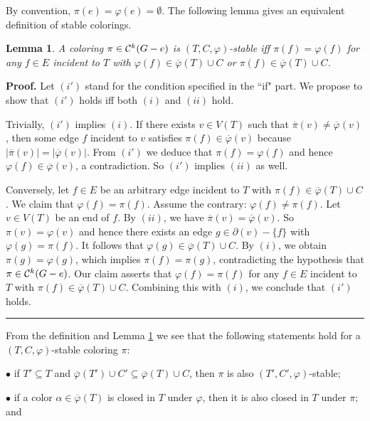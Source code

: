 \documentclass[11pt]{article}
\newtheorem{lemma}[theorem]{Lemma}
\def\qed{\hfill \rule{4pt}{7pt}}
\begin{document}
\vspace{-2mm}
By convention, $\pi(e)=\varphi(e)=\emptyset$. The following lemma gives an equivalent definition of stable colorings.

\begin{lemma} \label{sc1}
A coloring $\pi \in {\cal C}^k(G-e)$ is $(T, C, \varphi)$-stable iff $\pi(f)=\varphi(f)$ for any $f\in E$ incident to $T$ with 
$\varphi(f)\in \overline{\varphi}(T)\cup C$ or $\pi(f)\in \overline{\varphi}(T)\cup C$.
\end{lemma}

{\bf Proof.}  Let $(i')$ stand for the condition specified in the ``if" part. We propose to show that $(i')$ holds iff
both $(i)$ and $(ii)$ hold. 

Trivially, $(i')$ implies $(i)$. If there exists $v\in V(T)$ such that $\overline{\pi} (v) \ne \overline{\varphi}(v)$, 
then some edge $f$ incident to $v$ satisfies $\pi(f) \in \overline{\varphi}(v)$ because $|\overline{\pi} (v)|=|\overline{\varphi}(v)|$.
From $(i')$ we deduce that $\pi(f)=\varphi(f)$ and hence $\varphi(f) \in \overline{\varphi}(v)$, a contradiction. So $(i')$ implies 
$(ii)$ as well.  

Conversely, let $f \in E$ be an arbitrary edge incident to $T$ with $\pi(f)\in \overline{\varphi}(T)\cup C$. 
We claim that $\varphi(f) = \pi(f)$. Assume the contrary: $\varphi(f) \ne \pi(f)$. Let $v\in V(T)$ be an end of $f$. By $(ii)$, 
we have $\overline{\pi} (v) = \overline{\varphi}(v)$. So ${\pi} (v) = {\varphi}(v)$ and hence there exists an edge 
$g \in \partial(v)-\{f\}$ with $\varphi(g) = \pi(f)$. It follows that $\varphi(g) \in \overline{\varphi}(T)\cup C$.
By $(i)$, we obtain $\pi(g)=\varphi(g)$, which implies $\pi(f)=\pi(g)$, contradicting the hypothesis that 
$\pi \in {\cal C}^k(G-e)$. Our claim asserts that $\varphi(f)=\pi(f)$ for any $f\in E$ incident to $T$ with $\pi(f)\in 
\overline{\varphi}(T)\cup C$. Combining this with $(i)$, we conclude that $(i')$ holds. \qed

\vskip 3mm

From the definition and Lemma \ref{sc1} we see that the following statements hold for a $(T, C, \varphi)$-stable 
coloring $\pi$: 

$\bullet$ if $T' \subseteq T$ and $\overline{\varphi}(T')\cup C' \subseteq \overline{\varphi}(T)\cup C$, then $\pi$ is also $(T', C', \varphi)$-stable;

$\bullet$ if a color $\alpha \in \overline{\varphi}(T)$ is closed in $T$ under $\varphi$, then it is also closed in $T$ under $\pi$; and
\end{document}
